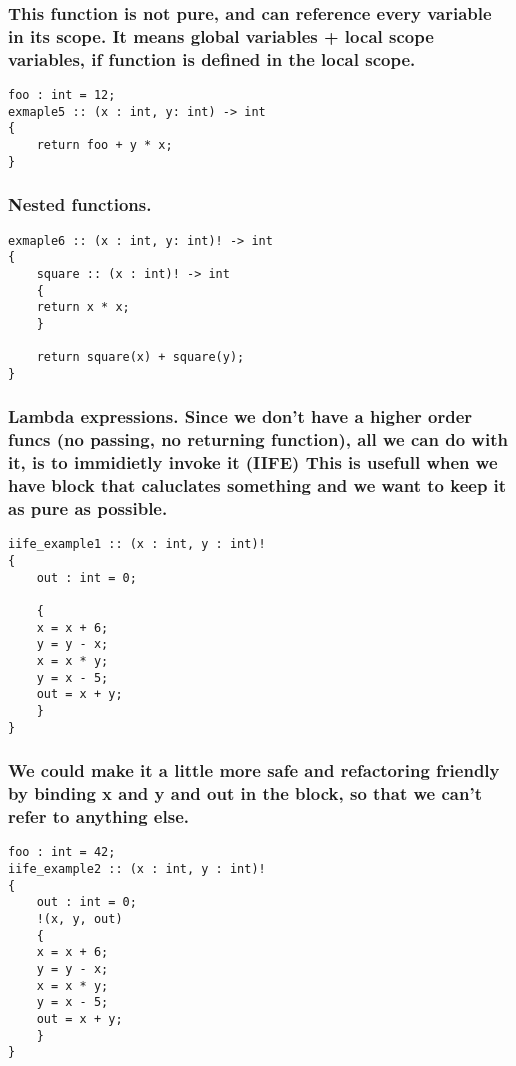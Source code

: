 \documentclass[11pt]{article}
\begin{document}
\subsubsection*{This function is not pure, and can reference every variable in its scope. It means global variables + local scope variables, if function is defined in the local scope.}
\label{sec:org3b04078}
\begin{verbatim}
foo : int = 12;
exmaple5 :: (x : int, y: int) -> int
{
    return foo + y * x;
}
\end{verbatim}

\subsubsection*{Nested functions.}
\label{sec:orgf9f9afc}
\begin{verbatim}
exmaple6 :: (x : int, y: int)! -> int
{
    square :: (x : int)! -> int
    {
	return x * x;
    }

    return square(x) + square(y);
}
\end{verbatim}

\subsubsection*{Lambda expressions. Since we don't have a higher order funcs (no passing, no returning function), all we can do with it, is to immidietly invoke it (IIFE) This is usefull when we have block that caluclates something and we want to keep it as pure as possible.}
\label{sec:orgf5423f3}
\begin{verbatim}
iife_example1 :: (x : int, y : int)!
{
    out : int = 0;

    {
	x = x + 6;
	y = y - x;
	x = x * y;
	y = x - 5;
	out = x + y;
    }
}
\end{verbatim}

\subsubsection*{We could make it a little more safe and refactoring friendly by binding x and y and out in the block, so that we can't refer to anything else.}
\label{sec:orgf3b156e}
\begin{verbatim}
foo : int = 42;
iife_example2 :: (x : int, y : int)!
{
    out : int = 0;
    !(x, y, out)
    {
	x = x + 6;
	y = y - x;
	x = x * y;
	y = x - 5;
	out = x + y;
    }
}
\end{verbatim}
\end{document}
